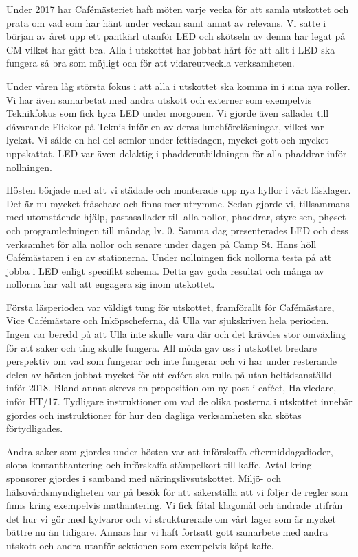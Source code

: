 \documentclass[../_main/handlingar.tex]{subfiles}
\begin{document}
Under 2017 har Cafémästeriet haft möten varje vecka för att samla utskottet och prata om vad som har hänt under veckan samt annat av relevans. Vi satte i början av året upp ett pantkärl utanför LED och skötseln av denna har legat på CM vilket har gått bra. Alla i utskottet har jobbat hårt för att allt i LED ska fungera så bra som möjligt och för att vidareutveckla verksamheten.

Under våren låg största fokus i att alla i utskottet ska komma in i sina nya roller. Vi har även samarbetat med andra utskott och externer som exempelvis Teknikfokus som fick hyra LED under morgonen. Vi gjorde även sallader till dåvarande Flickor på Teknis inför en av deras lunchföreläsningar, vilket var lyckat. Vi sålde en hel del semlor under fettisdagen, mycket gott och mycket uppskattat. LED var även delaktig i phadderutbildningen för alla phaddrar inför nollningen.

Hösten började med att vi städade och monterade upp nya hyllor i vårt läsklager. Det är nu mycket fräschare och finns mer utrymme. Sedan gjorde vi, tillsammans med utomstående hjälp, pastasallader till alla nollor, phaddrar, styrelsen, phøset och programledningen till måndag lv. 0. Samma dag presenterades LED och dess verksamhet för alla nollor och senare under dagen på Camp St. Hans höll Cafémästaren i en av stationerna. Under nollningen fick nollorna testa på att jobba i LED enligt specifikt schema. Detta gav goda resultat och många av nollorna har valt att engagera sig inom utskottet.

Första läsperioden var väldigt tung för utskottet, framförallt för Cafémästare, Vice Cafémästare och Inköpscheferna, då Ulla var sjukskriven hela perioden. Ingen var beredd på att Ulla inte skulle vara där och det krävdes stor omväxling för att saker och ting skulle fungera. All möda gav oss i utskottet bredare perspektiv om vad som fungerar och inte fungerar och vi har under resterande delen av hösten jobbat mycket för att caféet ska rulla på utan heltidsanställd inför 2018. Bland annat skrevs en proposition om ny post i caféet, Halvledare, inför HT/17. Tydligare instruktioner om vad de olika posterna i utskottet innebär gjordes och instruktioner för hur den dagliga verksamheten ska skötas förtydligades. 

Andra saker som gjordes under hösten var att införskaffa eftermiddagsdioder, slopa kontanthantering och införskaffa stämpelkort till kaffe. Avtal kring sponsorer gjordes i samband med näringslivsutskottet. Miljö- och hälsovårdsmyndigheten var på besök för att säkerställa att vi följer de regler som finns kring exempelvis mathantering. Vi fick fåtal klagomål och ändrade utifrån det hur vi gör med kylvaror och vi strukturerade om vårt lager som är mycket bättre nu än tidigare. Annars har vi haft fortsatt gott samarbete med andra utskott och andra utanför sektionen som exempelvis köpt kaffe. 
\end{document}
